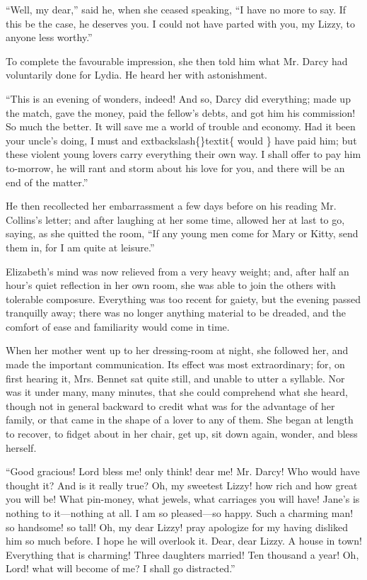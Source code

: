 \documentclass[10pt]{book}
\begin{document}
   “Well, my dear,” said he, when she ceased speaking, “I have no more to
say. If this be the case, he deserves you. I could not have parted with
you, my Lizzy, to anyone less worthy.”
  

   To complete the favourable impression, she then told him what Mr. Darcy
had voluntarily done for Lydia. He heard her with astonishment.
  

   “This is an evening of wonders, indeed! And so, Darcy did everything;
made up the match, gave the money, paid the fellow’s debts, and got him
his commission! So much the better. It will save me a world of trouble
and economy. Had it been your uncle’s doing, I must and
   	extbackslash\{\}textit\{
    would
   \}
   have
paid him; but these violent
   young lovers carry everything their own
way. I shall offer to pay him to-morrow, he will rant and storm about
his love for you, and there will be an end of the matter.”
  

   He then recollected her embarrassment a few days before on his reading
Mr. Collins’s letter; and after laughing at her some time, allowed her
at last to go, saying, as she quitted the room, “If any young men come
for Mary or Kitty, send them in, for I am quite at leisure.”
  

   Elizabeth’s mind was now relieved from a very heavy weight; and, after
half an hour’s quiet reflection in her own room, she was able to join
the others with tolerable composure. Everything was too recent for
gaiety, but the evening passed tranquilly away; there was no longer
anything material to be dreaded, and the comfort of ease and familiarity
would come in time.
  

   When her mother went up to her dressing-room at night, she followed her,
and made the important communication. Its effect was most extraordinary;
for, on first hearing it, Mrs. Bennet sat quite still, and unable to
utter a syllable. Nor was it under many, many minutes, that she could
comprehend what she heard, though not in general backward to credit what
was for the advantage of her family, or that came in the shape of a
lover to any of them. She began at length to recover, to fidget about in
her chair, get up, sit down again, wonder, and bless herself.
  

   “Good gracious! Lord bless me! only think! dear me! Mr. Darcy! Who would
have thought it? And is it really true? Oh, my sweetest Lizzy! how rich
and how great you will be! What pin-money, what jewels, what carriages
you will have! Jane’s is nothing to it—nothing at all. I am so
pleased—so happy. Such a charming man! so handsome! so tall! Oh, my
dear
   Lizzy! pray apologize for my having disliked him so much before. I
hope he will overlook it. Dear, dear Lizzy. A house in town! Everything
that is charming! Three daughters married! Ten thousand a year! Oh,
Lord! what will become of me? I shall go distracted.”
  
\end{document}
